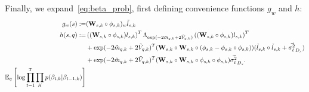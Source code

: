 Finally, we expand~\ref{eq:beta_prob}, first defining convenience functions $g_w$ and $h$:
\begin{align}
 \label{eq:chain_elbo}
g_w(s) := & ( \W_{s,k} \circ \phi_{s,k} )_w \lv_{s,k} \\  \nonumber
h(s, q) := & \left( (\W_{s,k} \circ \phi_{s,k}) l_{s,k} \right)^T
       \Lambda_{\exp(-2 \mv_{q,k} + 2 \vv_{q,k})}
       \left( (\W_{s,k} \circ \phi_{s,k}) l_{s,k} \right)^T \notag \\  \nonumber
       & + \exp(-2 \mv_{q,k} + 2 \vv_{q,k})^T ( \W_{s,k} \circ \W_{s,k} \circ ( \phi_{s,k} - \phi_{s,k} \circ \phi_{s,k} ) ) (\lv_{s,k} \circ \lv_{s,k} + \vec{\vlv}_{D_{s}}) \notag \\  \nonumber
       & + \exp(-2 \mv_{q,k} + 2 \vv_{q,k})^T ( \W_{s,k} \circ \W_{s,k} \circ \phi_{s,k} \circ \phi_{s,k} ) \vec{\vlv}_{D_{s}}. \notag \\  \nonumber
 \expectq{ \log \prod_{t=1}^T \prod_K p(\beta_{t,k} |\beta_{t-1,k}) }

\end{align}
